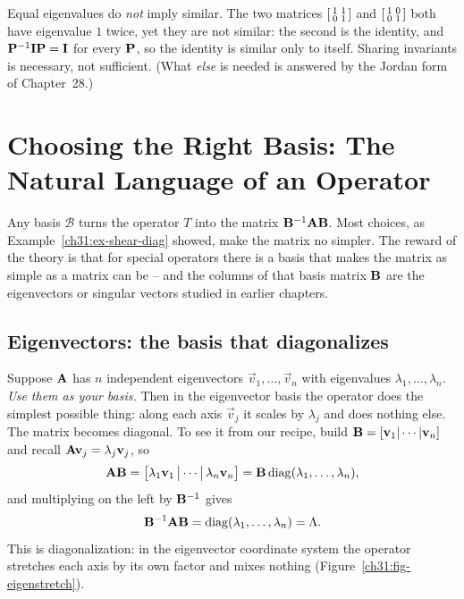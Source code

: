 \begin{trapbox}
Equal eigenvalues do \emph{not} imply similar. The two matrices
$\begin{bsmallmatrix}1&1\\0&1\end{bsmallmatrix}$ and
$\begin{bsmallmatrix}1&0\\0&1\end{bsmallmatrix}$ both have eigenvalue $1$ twice,
yet they are not similar: the second is the identity, and $\mathbf{P}^{-1}\mathbf{I}\mathbf{P}=\mathbf{I}$
for every $\mathbf{P}$, so the identity is similar only to itself. Sharing invariants
is necessary, not sufficient. (What \emph{else} is needed is answered by the
Jordan form of Chapter~28.)
\end{trapbox}

\section{Choosing the Right Basis: The Natural Language of an Operator}
\label{ch31:right-basis}

Any basis $\mathcal{B}$ turns the operator $T$ into the
matrix $\mathbf{B}^{-1}\mathbf{A}\mathbf{B}$. Most choices, as Example~\ref{ch31:ex-shear-diag}
showed, make the matrix no simpler. The reward of the theory is that for
special operators there is a basis that makes the matrix as simple as a matrix can
be -- and the columns of that basis matrix $\mathbf{B}$ are the eigenvectors or singular vectors studied in earlier chapters.

\subsection{Eigenvectors: the basis that diagonalizes}
\label{ch31:eigenbasis}

Suppose $\mathbf{A}$ has $n$ independent eigenvectors $\vec{v}_1,\dots,\vec{v}_n$ with
eigenvalues $\lambda_1,\dots,\lambda_n$. \emph{Use them as your basis.} Then in the
eigenvector basis the operator does the simplest possible thing: along each axis
$\vec{v}_j$ it scales by $\lambda_j$ and does nothing else. The matrix
becomes diagonal. To see it from our recipe, build $\mathbf{B}=[\mathbf{v}_1|\cdots|\mathbf{v}_n]$
and recall $\mathbf{A}\mathbf{v}_j=\lambda_j\mathbf{v}_j$, so
\[
  \mathbf{A}\mathbf{B} = \big[\lambda_1\mathbf{v}_1\,\big|\cdots\big|\,\lambda_n\mathbf{v}_n\big]
  = \mathbf{B}\operatorname{diag}(\lambda_1,\dots,\lambda_n),
\]
and multiplying on the left by $\mathbf{B}^{-1}$ gives
\[
  \mathbf{B}^{-1}\mathbf{A}\mathbf{B} = \operatorname{diag}(\lambda_1,\dots,\lambda_n) = \Lambda.
\]
This is diagonalization: in the eigenvector coordinate system the operator
stretches each axis by its own factor and mixes nothing
(Figure~\ref{ch31:fig-eigenstretch}).

